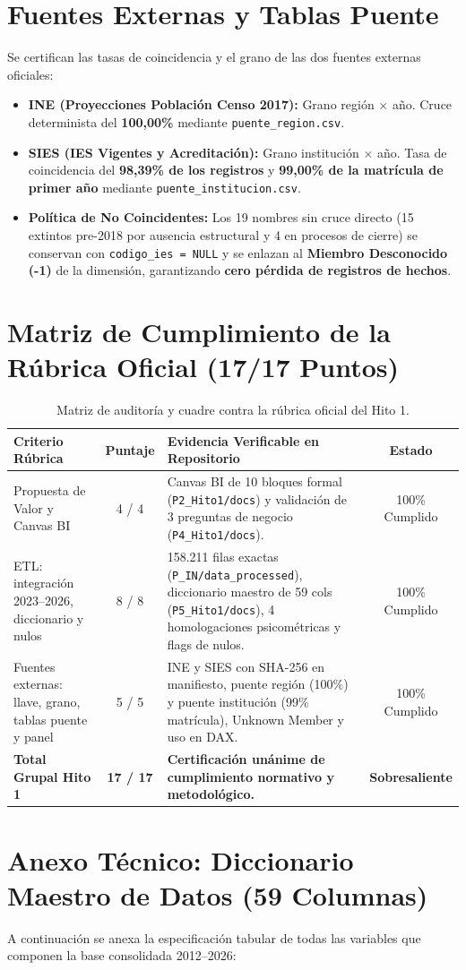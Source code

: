\documentclass[11pt,a4paper]{article}
\begin{document}
\section{Fuentes Externas y Tablas Puente}
Se certifican las tasas de coincidencia y el grano de las dos fuentes externas oficiales:
\begin{itemize}
    \item \textbf{INE (Proyecciones Población Censo 2017):} Grano región $\times$ año. Cruce determinista del \textbf{100,00\%} mediante \texttt{puente\_region.csv}.
    \item \textbf{SIES (IES Vigentes y Acreditación):} Grano institución $\times$ año. Tasa de coincidencia del \textbf{98,39\% de los registros} y \textbf{99,00\% de la matrícula de primer año} mediante \texttt{puente\_institucion.csv}.
    \item \textbf{Política de No Coincidentes:} Los 19 nombres sin cruce directo (15 extintos pre-2018 por ausencia estructural y 4 en procesos de cierre) se conservan con \texttt{codigo\_ies = NULL} y se enlazan al \textbf{Miembro Desconocido (-1)} de la dimensión, garantizando \textbf{cero pérdida de registros de hechos}.
\end{itemize}

\section{Matriz de Cumplimiento de la Rúbrica Oficial (17/17 Puntos)}
\begin{table}[h!]
\centering
\footnotesize
\begin{tabularx}{\textwidth}{p{4.2cm}cp{7.5cm}c}
\toprule
\textbf{Criterio Rúbrica} & \textbf{Puntaje} & \textbf{Evidencia Verificable en Repositorio} & \textbf{Estado} \\
\midrule
Propuesta de Valor y Canvas BI & 4 / 4 & Canvas BI de 10 bloques formal (\texttt{P2\_Hito1/docs}) y validación de 3 preguntas de negocio (\texttt{P4\_Hito1/docs}). & 100\% Cumplido \\
ETL: integración 2023--2026, diccionario y nulos & 8 / 8 & 158.211 filas exactas (\texttt{P\_IN/data\_processed}), diccionario maestro de 59 cols (\texttt{P5\_Hito1/docs}), 4 homologaciones psicométricas y flags de nulos. & 100\% Cumplido \\
Fuentes externas: llave, grano, tablas puente y panel & 5 / 5 & INE y SIES con SHA-256 en manifiesto, puente región (100\%) y puente institución (99\% matrícula), Unknown Member y uso en DAX. & 100\% Cumplido \\
\midrule
\textbf{Total Grupal Hito 1} & \textbf{17 / 17} & \textbf{Certificación unánime de cumplimiento normativo y metodológico.} & \textbf{Sobresaliente} \\
\bottomrule
\end{tabularx}
\caption{Matriz de auditoría y cuadre contra la rúbrica oficial del Hito 1.}
\label{tab:rubrica}
\end{table}

\section{Anexo Técnico: Diccionario Maestro de Datos (59 Columnas)}
A continuación se anexa la especificación tabular de todas las variables que componen la base consolidada 2012--2026:


\end{document}
